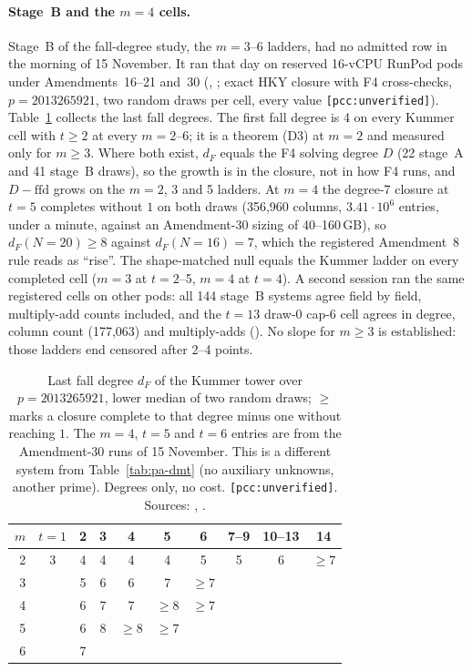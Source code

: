 \paragraph{Stage~B and the $m=4$ cells.} Stage~B of the fall-degree study,
the $m=3$--6 ladders, had no admitted row in the morning of 15 November. It
ran that day on reserved 16-vCPU RunPod pods under Amendments~16--21 and~30
(,
;
exact HKY closure with F4 cross-checks, $p=2013265921$, two random draws
per cell, every value \texttt{[pcc:unverified]}).
Table~\ref{tab:pa-dfm} collects the last fall degrees. The first fall degree
is 4 on every Kummer cell with $t\ge2$ at every $m=2$--6; it is a theorem
(D3) at $m=2$ and measured only for $m\ge3$. Where both exist, $d_F$ equals
the F4 solving degree $D$ (22 stage~A and 41 stage~B draws), so the growth is
in the closure, not in how F4 runs, and $D-\mathrm{ffd}$ grows on the $m=2$,
3 and 5 ladders. At $m=4$ the degree-7 closure at $t=5$ completes without
$1$ on both draws (356{,}960 columns, $3.41\cdot10^6$ entries, under a minute,
against an Amendment-30 sizing of 40--160\,GB), so $d_F(N{=}20)\ge8$ against
$d_F(N{=}16)=7$, which the registered Amendment~8 rule reads as ``rise''. The
shape-matched null equals the Kummer ladder on every completed cell ($m=3$
at $t=2$--5, $m=4$ at $t=4$). A second session ran the same registered cells
on other pods: all 144 stage~B systems agree field by field, multiply-add
counts included, and the $t=13$ draw-0 cap-6 cell agrees in degree, column
count (177{,}063) and multiply-adds
().
No slope for $m\ge3$ is established: those ladders end censored after 2--4
points.

\begin{table}[t]
\centering\small
\begin{tabular}{@{}rccccccccc@{}}
\toprule
$m$ & $t=1$ & 2 & 3 & 4 & 5 & 6 & 7--9 & 10--13 & 14 \\
\midrule
2 & 3 & 4 & 4 & 4 & 4 & 5 & 5 & 6 & $\ge7$ \\
3 & & 5 & 6 & 6 & 7 & $\ge7$ & & & \\
4 & & 6 & 7 & 7 & $\ge8$ & $\ge7$ & & & \\
5 & & 6 & 8 & $\ge8$ & $\ge7$ & & & & \\
6 & & 7 & & & & & & & \\
\bottomrule
\end{tabular}
\caption[]{Last fall degree $d_F$ of the Kummer tower over
$p=2013265921$, lower median of two random draws; $\ge$ marks a closure
complete to that degree minus one without reaching $1$. The $m=4$, $t=5$
and $t=6$ entries are from the Amendment-30 runs of 15 November. This is a
different system from Table~\ref{tab:pa-dmt} (no auxiliary unknowns, another
prime). Degrees only, no cost. \texttt{[pcc:unverified]}. Sources:
,
.}
\label{tab:pa-dfm}
\end{table}

